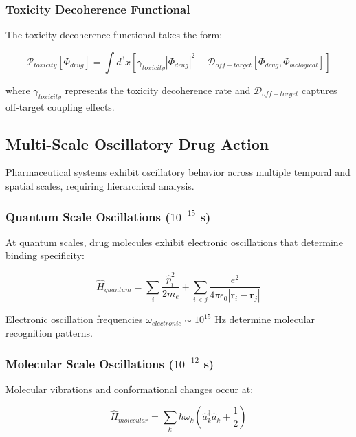 \documentclass[12pt,a4paper]{article}
\begin{document}
\subsubsection{Toxicity Decoherence Functional}

The toxicity decoherence functional takes the form:

\begin{equation}
\mathcal{P}_{toxicity}[\Phi_{drug}] = \int d^3x \left[\gamma_{toxicity}|\Phi_{drug}|^2 + \mathcal{D}_{off-target}[\Phi_{drug}, \Phi_{biological}]\right]
\end{equation}

where $\gamma_{toxicity}$ represents the toxicity decoherence rate and $\mathcal{D}_{off-target}$ captures off-target coupling effects.

\subsection{Multi-Scale Oscillatory Drug Action}

Pharmaceutical systems exhibit oscillatory behavior across multiple temporal and spatial scales, requiring hierarchical analysis.

\subsubsection{Quantum Scale Oscillations ($10^{-15}$ s)}

At quantum scales, drug molecules exhibit electronic oscillations that determine binding specificity:

\begin{equation}
\hat{H}_{quantum} = \sum_i \frac{\hat{p}_i^2}{2m_e} + \sum_{i<j} \frac{e^2}{4\pi\epsilon_0 |\mathbf{r}_i - \mathbf{r}_j|}
\end{equation}

Electronic oscillation frequencies $\omega_{electronic} \sim 10^{15}$ Hz determine molecular recognition patterns.

\subsubsection{Molecular Scale Oscillations ($10^{-12}$ s)}

Molecular vibrations and conformational changes occur at:

\begin{equation}
\hat{H}_{molecular} = \sum_k \hbar\omega_k \left(\hat{a}_k^\dagger \hat{a}_k + \frac{1}{2}\right)
\end{equation}
\end{document}
